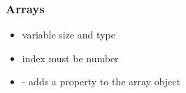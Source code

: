 \begin{frame}[fragile] \frametitle{Arrays}
\begin{itemize}
  \item variable size and type
  \item index must be number
  \item {} - adds a property to the array object
\end{itemize}
\end{frame}